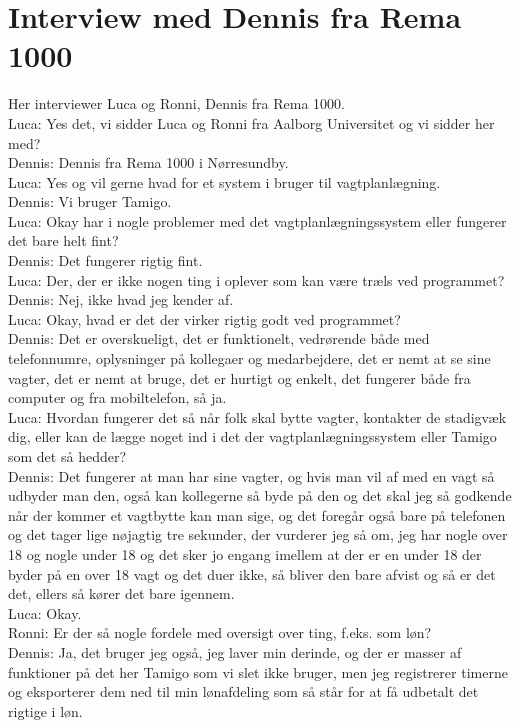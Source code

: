 \section{Interview med Dennis fra Rema 1000} \label{app:rema}
Her interviewer Luca og Ronni, Dennis fra Rema 1000.\\
Luca: Yes det, vi sidder Luca og Ronni fra Aalborg Universitet og vi sidder her med?\\
Dennis: Dennis fra Rema 1000 i Nørresundby.\\
Luca: Yes og vil gerne hvad for et system i bruger til vagtplanlægning.\\
Dennis: Vi bruger Tamigo.\\
Luca: Okay har i nogle problemer med det vagtplanlægningssystem eller fungerer det bare helt fint?\\
Dennis: Det fungerer rigtig fint.\\
Luca: Der, der er ikke nogen ting i oplever som kan være træls ved programmet?\\
Dennis: Nej, ikke hvad jeg kender af.\\
Luca: Okay, hvad er det der virker rigtig godt ved programmet?\\
Dennis: Det er overskueligt, det er funktionelt, vedrørende både med telefonnumre, oplysninger på kollegaer og medarbejdere, det er nemt at se sine vagter, det er nemt at bruge, det er hurtigt og enkelt, det fungerer både fra computer og fra mobiltelefon, så ja.\\
Luca: Hvordan fungerer det så når folk skal bytte vagter, kontakter de stadigvæk dig, eller kan de lægge noget ind i det der vagtplanlægningssystem eller Tamigo som det så hedder?\\
Dennis: Det fungerer at man har sine vagter, og hvis man vil af med en vagt så udbyder man den, også kan kollegerne så byde på den og det skal jeg så godkende når der kommer et vagtbytte kan man sige, og det foregår også bare på telefonen og det tager lige nøjagtig tre sekunder, der vurderer jeg så om, jeg har nogle over 18 og nogle under 18 og det sker jo engang imellem at der er en under 18 der byder på en over 18 vagt og det duer ikke, så bliver den bare afvist og så er det det, ellers så kører det bare igennem.\\
Luca: Okay.\\
Ronni: Er der så nogle fordele med oversigt over ting, f.eks. som løn?\\
Dennis: Ja, det bruger jeg også, jeg laver min derinde, og der er masser af funktioner på det her Tamigo som vi slet ikke bruger, men jeg registrerer timerne og eksporterer dem ned til min lønafdeling som så står for at få udbetalt det rigtige i løn.\\
